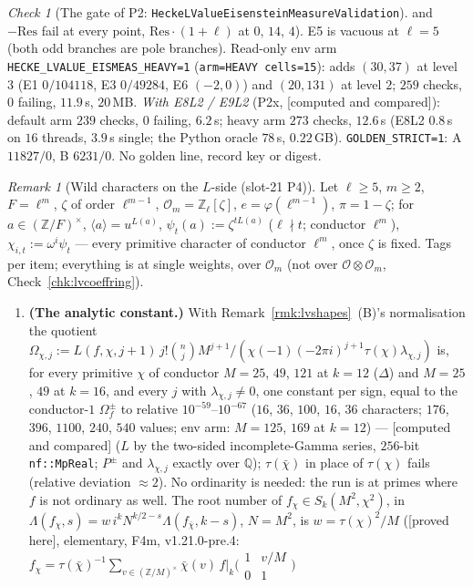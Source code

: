 \documentclass[11pt]{article}
\theoremstyle{remark}
\newtheorem{remark}[theorem]{Remark}
\newtheorem{checkitem}[theorem]{Check}
\newcommand{\Z}{\mathbb{Z}}
\newcommand{\Q}{\mathbb{Q}}
\newcommand{\PROVED}{\textsf{[proved here]}}
\newcommand{\CMPD}{\textsf{[computed and compared]}}   %
\begin{document}
\begin{checkitem}[The gate of P2: \texttt{HeckeLValueEisensteinMeasureValidation}]
and $-\mathrm{Res}$ fail at every point, $\mathrm{Res}\cdot(1+\ell)$ at $0$, $14$, $4$). E5 is vacuous at $\ell=5$ (both odd branches are pole branches). Read-only env arm
\texttt{HECKE\_LVALUE\_EISMEAS\_HEAVY=1} (\texttt{arm=HEAVY cells=15}): adds $(30,37)$ at level $3$ (E1 $0/104118$, E3 $0/49284$, E6 $(-2,0)$) and $(20,131)$ at level $2$; $259$ checks, $0$ failing,
$11.9$\,s, $20$\,MB. \emph{With E8L2 / E9L2} (P2x, \CMPD): default arm $239$ checks, $0$ failing, $6.2$\,s; heavy arm $273$ checks, $12.6$\,s (E8L2 $0.8$\,s on $16$ threads, $3.9$\,s single; the Python oracle $78$\,s, $0.22$\,GB). \texttt{GOLDEN\_STRICT=1}: A $11827/0$, B $6231/0$. No golden line, record key or digest.
\end{checkitem}

\begin{remark}[Wild characters on the $L$-side (slot-21 P4)]\label{rmk:lvwild}
Let $\ell\ge5$, $m\ge2$, $F=\ell^{m}$, $\zeta$ of order $\ell^{m-1}$, $\mathcal O_m=\Z_\ell[\zeta]$, $e=\varphi(\ell^{m-1})$, $\pi=1-\zeta$; for $a\in(\Z/F)^{\times}$, $\langle a\rangle=u^{L(a)}$,
$\psi_t(a):=\zeta^{tL(a)}$ ($\ell\nmid t$; conductor $\ell^{m}$), $\chi_{i,t}:=\omega^{i}\psi_t$ --- every primitive character of conductor $\ell^{m}$, once $\zeta$ is fixed. Tags per item; everything
is at single weights, over $\mathcal O_m$ (not over $\mathcal O\otimes\mathcal O_m$, Check~\ref{chk:lvcoeffring}).
\begin{enumerate}
\item \textbf{(The analytic constant.)} With Remark~\ref{rmk:lvshapes}~(B)'s normalisation the quotient $\Omega_{\chi,j}:=L(f,\chi,j+1)\,j!\binom nj M^{j+1}/(\chi(-1)(-2\pi i)^{j+1}\tau(\chi)\lambda_{\chi,j})$
  is, for every primitive $\chi$ of conductor $M=25$, $49$, $121$ at $k=12$ ($\Delta$) and $M=25$, $49$ at $k=16$, and every $j$ with $\lambda_{\chi,j}\ne0$, one constant per sign, equal to the
  conductor-$1$ $\Omega_f^{\pm}$ to relative $10^{-59}$--$10^{-67}$ ($16$, $36$, $100$, $16$, $36$ characters; $176$, $396$, $1100$, $240$, $540$ values; env arm: $M=125$, $169$ at $k=12$) --- \CMPD{}
  ($L$ by the two-sided incomplete-Gamma series, $256$-bit \texttt{nf::MpReal}; $P^{\pm}$ and $\lambda_{\chi,j}$ exactly over $\Q$); $\tau(\bar\chi)$ in place of $\tau(\chi)$ fails (relative deviation
  $\approx2$). No ordinarity is needed: the run is at primes where $f$ is not ordinary as well. The root number of $f_\chi\in S_k(M^{2},\chi^{2})$, in
  $\Lambda(f_\chi,s)=w\,i^{k}N^{k/2-s}\Lambda(f_{\bar\chi},k-s)$, $N=M^{2}$, is $w=\tau(\chi)^{2}/M$ (\PROVED, elementary, F4m, v1.21.0-pre.4: $f_\chi=\tau(\bar\chi)^{-1}\sum_{v\in(\Z/M)^{\times}}\bar\chi(v)\,f|_k\bigl(\begin{smallmatrix}1&v/M\\0&1\end{smallmatrix}\bigr)$

\end{enumerate}
\end{remark}
\end{document}
